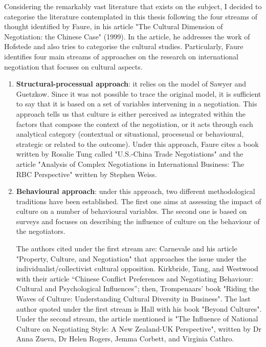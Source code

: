 \documentclass[../main.tex]{subfiles}
\begin{document}
Considering the remarkably vast literature that exists on the subject, I decided to categorise the literature contemplated %
in this thesis following the four streams of thought identified by Faure, in his article "The Cultural Dimension of Negotiation: the Chinese Case" (1999). In the article, he addresses the work of Hofstede and also tries to categorise the cultural studies. Particularly, Faure identifies four main streams of approaches on the research on international negotiation that focuses on cultural aspects.
\begin{enumerate}
\item \textbf{Structural-processual approach}: it relies on the model of Sawyer and Guetzkow. Since it was not possible to trace the original model, it is sufficient to say that it is based on a set of variables intervening in a negotiation. This approach tells us that culture is either perceived as integrated within the factors that compose the context of the negotiation, or it acts through each analytical category (contextual or situational, processual or behavioural, strategic or related to the outcome).
Under this approach, Faure cites a book written by Rosalie Tung called "U.S.-China Trade Negotiations" and the article "Analysis of Complex Negotiations in International Business: The RBC Perspective" written by Stephen Weiss.
\item \textbf{Behavioural approach}: under this approach, two different methodological traditions have been established. The first one aims at assessing the impact of culture on a number of behavioural variables. The second one is based on surveys and focuses on describing the influence of culture on the behaviour of the negotiators.

The authors cited under the first stream are: Carnevale and his article "Property, Culture, and Negotiation" that approaches the issue under the individualist/collectivist cultural opposition. Kirkbride, Tang, and Westwood with their article “Chinese Conflict Preferences and Negotiating Behaviour: Cultural and Psychological Influences”; then, Trompenaars' book "Riding the Waves of Culture: Understanding Cultural Diversity in Business". The last author quoted under the first stream is Hall with his book "Beyond Cultures".
Under the second stream, the article mentioned is "The Influence of National Culture on Negotiating Style: A New Zealand-UK Perspective", written by Dr Anna Zueva, Dr Helen Rogers, Jemma Corbett, and Virginia Cathro.


\end{enumerate}
\end{document}
